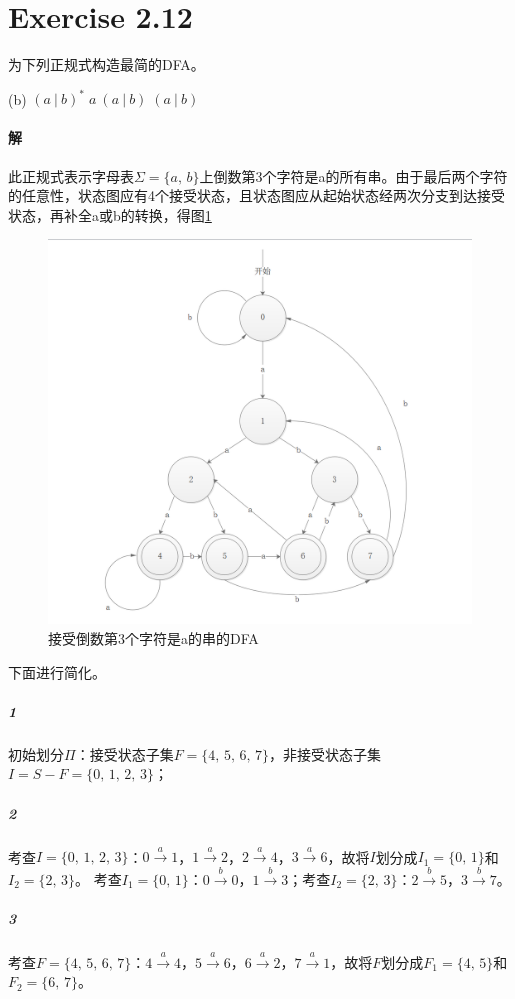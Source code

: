\documentclass{article}
\begin{document}
\section{Exercise 2.12}
为下列正规式构造最简的DFA。\par
(b) $(a\ |\ b)^*\;a\ (a\ |\ b)\;(a\ |\ b)$
\\

\paragraph{解}
此正规式表示字母表$\Sigma=\{a,\,b\}$上倒数第3个字符是a的所有串。由于最后两个字符的任意性，状态图应有4个接受状态，且状态图应从起始状态经两次分支到达接受状态，再补全a或b的转换，得图\ref{fig:2}\par
\begin{figure}
\centering
\includegraphics[scale=0.6]{DFA2.png}
\caption{接受倒数第3个字符是a的串的DFA}
\label{fig:2}
\end{figure}
下面进行简化。
\subparagraph{1}
初始划分$\Pi$：接受状态子集$F=\{4,\,5,\,6,\,7\}$，非接受状态子集$I=S-F=\{0,\,1,\,2,\,3\}$；
\subparagraph{2}
考查$I=\{0,\,1,\,2,\,3\}$：$0 \xrightarrow{a} 1$，$1 \xrightarrow{a} 2$，$2 \xrightarrow{a} 4$，$3 \xrightarrow{a} 6$，故将$I$划分成$I_1=\{0,\,1\}$和$I_2=\{2,\,3\}$。
考查$I_1=\{0,\,1\}$：$0 \xrightarrow{b} 0$，$1 \xrightarrow{b} 3$；考查$I_2=\{2,\,3\}$：$2 \xrightarrow{b} 5$，$3 \xrightarrow{b} 7$。
\subparagraph{3}
考查$F=\{4,\,5,\,6,\,7\}$：$4 \xrightarrow{a} 4$，$5 \xrightarrow{a} 6$，$6  \xrightarrow{a} 2$，$7 \xrightarrow{a} 1$，故将$F$划分成$F_1=\{4,\,5\}$和$F_2=\{6,\,7\}$。
\end{document}
